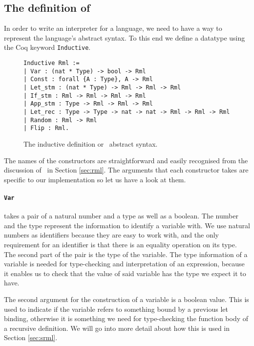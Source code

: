 \documentclass[11pt, leqno, titlepage]{article}
\def\coqe{\lstinline[language=Coq, basicstyle=\small]}
\theoremstyle{definition}
\begin{document}
\subsection{The definition of \rmlx}
\label{sec:rmlx}

In order to write an interpreter for a language, we need to have a way to represent
the language's abstract syntax. To this end we define a datatype using the Coq
keyword \coqe{Inductive}. 

\begin{figure}[h]
  \centering
  \begin{minipage}{0.8\linewidth}
    \begin{lstlisting}[language=coq]
Inductive Rml :=
| Var : (nat * Type) -> bool -> Rml 
| Const : forall {A : Type}, A -> Rml
| Let_stm : (nat * Type) -> Rml -> Rml -> Rml
| If_stm : Rml -> Rml -> Rml -> Rml
| App_stm : Type -> Rml -> Rml -> Rml
| Let_rec : Type -> Type -> nat -> nat -> Rml -> Rml -> Rml
| Random : Rml -> Rml
| Flip : Rml.
    \end{lstlisting}
  \end{minipage}
  \caption{The inductive definition or \rmlx\ abstract syntax.}
  \label{fig:rmlx}
\end{figure}


The names of the constructors are straightforward and easily recognised from the
discussion of \rml\ in Section \ref{sec:rml}. The arguments that each constructor
takes are specific to our implementation so let us have a look at them.

\paragraph{\coqe{Var}} takes a pair of a natural number and a type as well as a boolean. 
The number and the type represent the information to identify a variable with. We use
natural numbers as identifiers because they are easy to work with, and the only
requirement for an identifier is that there is an equality operation on its type. The
second part of the pair is the type of the variable. The type information of a
variable is needed for type-checking and interpretation of an expression, because it
enables us to check that the value of said variable has the type we expect it to
have.

The second argument for the construction of a variable is a boolean value. This is
used to indicate if the variable refers to something bound by a previous let binding,
otherwise it is something we need for type-checking the function body of a recursive
definition. We will go into more detail about how this is used in Section \ref{sec:srml}.
\end{document}
